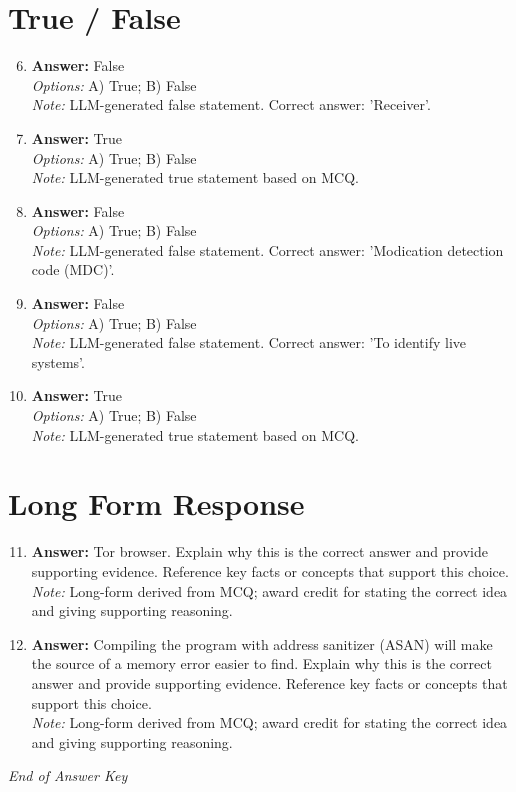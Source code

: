 \documentclass[12pt]{article}
\begin{document}
\section*{True / False}
\begin{enumerate}[label=\arabic*.]
\setcounter{enumi}{5}
\item \textbf{Answer:} False
\\ \textit{Options:} A) True; B) False
\\ \textit{Note:} LLM-generated false statement. Correct answer: 'Receiver'.
\item \textbf{Answer:} True
\\ \textit{Options:} A) True; B) False
\\ \textit{Note:} LLM-generated true statement based on MCQ.
\item \textbf{Answer:} False
\\ \textit{Options:} A) True; B) False
\\ \textit{Note:} LLM-generated false statement. Correct answer: 'Modication detection code (MDC)'.
\item \textbf{Answer:} False
\\ \textit{Options:} A) True; B) False
\\ \textit{Note:} LLM-generated false statement. Correct answer: 'To identify live systems'.
\item \textbf{Answer:} True
\\ \textit{Options:} A) True; B) False
\\ \textit{Note:} LLM-generated true statement based on MCQ.
\end{enumerate}

\section*{Long Form Response}
\begin{enumerate}[label=\arabic*.]
\setcounter{enumi}{10}
\item \textbf{Answer:} Tor browser. Explain why this is the correct answer and provide supporting evidence. Reference key facts or concepts that support this choice.
\\ \textit{Note:} Long-form derived from MCQ; award credit for stating the correct idea and giving supporting reasoning.
\item \textbf{Answer:} Compiling the program with address sanitizer (ASAN) will make the source of a memory error easier to find. Explain why this is the correct answer and provide supporting evidence. Reference key facts or concepts that support this choice.
\\ \textit{Note:} Long-form derived from MCQ; award credit for stating the correct idea and giving supporting reasoning.
\end{enumerate}

\vfill
\noindent\textit{End of Answer Key}
\end{document}
